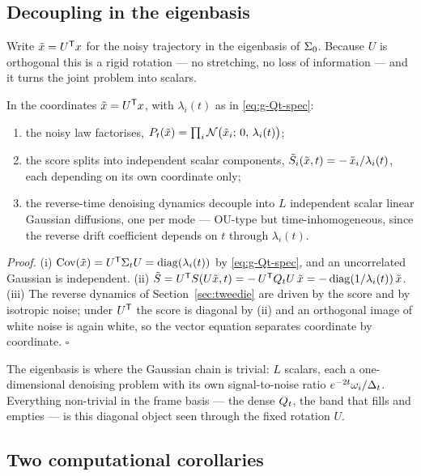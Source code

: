\subsection{Decoupling in the eigenbasis}

Write $\tilde x = U^{\mathsf{T}} x$ for the noisy trajectory in the eigenbasis of
$\Sigma_0$. Because $U$ is orthogonal this is a rigid rotation --- no stretching,
no loss of information --- and it turns the joint problem into scalars.

\begin{theorem}[Decoupling]\label{thm:g-decouple}
In the coordinates $\tilde x = U^{\mathsf{T}} x$, with $\lambda_i(t)$ as in
\eqref{eq:g-Qt-spec}:
\begin{enumerate}
\item the noisy law factorises,
  $P_t(\tilde x) = \prod_{i} \mathcal{N}\big(\tilde x_i;\, 0,\, \lambda_i(t)\big)$;
\item the score splits into independent scalar components,
  $\tilde{S}_i(\tilde x, t) = -\,\tilde x_i / \lambda_i(t)$, each depending
  on its own coordinate only;
\item the reverse-time denoising dynamics decouple into $L$ independent
  scalar linear Gaussian diffusions, one per mode --- OU-type but
  time-inhomogeneous, since the reverse drift coefficient
  depends on $t$ through $\lambda_i(t)$.
\end{enumerate}
\end{theorem}

\emph{Proof.} (i) $\operatorname{Cov}(\tilde x) = U^{\mathsf{T}} \Sigma_t U
= \operatorname{diag}(\lambda_i(t))$ by \eqref{eq:g-Qt-spec}, and an
uncorrelated Gaussian is independent. (ii)
$\tilde{S} = U^{\mathsf{T}} S(U\tilde x, t) = -\,U^{\mathsf{T}} Q_t U\, \tilde x
= -\operatorname{diag}(1/\lambda_i(t))\,\tilde x$. (iii) The reverse dynamics of
Section~\ref{sec:tweedie} are driven by the score and by isotropic noise;
under $U^{\mathsf{T}}$ the score is diagonal by (ii) and an orthogonal image of white
noise is again white, so the vector equation separates coordinate by
coordinate. \hfill$\square$

The eigenbasis is where the Gaussian chain is trivial: $L$ scalars, each a
one-dimensional denoising problem with its own signal-to-noise ratio
$e^{-2t}\omega_i/\Delta_t$. Everything non-trivial in the frame basis --- the
dense $Q_t$, the band that fills and empties --- is this diagonal object seen
through the fixed rotation $U$.


\subsection{Two computational corollaries}

